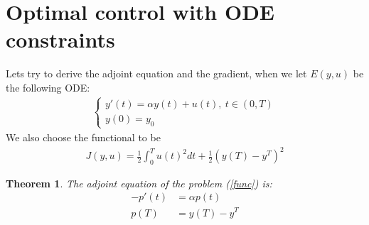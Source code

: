 \documentclass[11pt,a4paper]{article}
\newtheorem{theorem}{Theorem}
\begin{document}
\section{Optimal control with ODE constraints}
Lets try to derive the adjoint equation and the gradient, when we let $E(y,u)$ be the following ODE:
\begin{align*}
\left\{
     \begin{array}{lr}
       	y'(t)=\alpha y(t) +u(t), \ t \in (0,T)\\
       	   y(0)=y_0
     \end{array}
   \right.
\end{align*}
We also choose the functional to be
\begin{align}
J(y,u) = \frac{1}{2}\int_0^Tu(t)^2dt + \frac{1}{2}(y(T)-y^T)^2 \label{func}
\end{align}
\begin{theorem}
The adjoint equation of the problem (\ref{func}) is:
\begin{align*}     
-p'(t) &= \alpha p(t) \\
p(T) &= y(T)-y^T     
\end{align*}
\end{theorem}
\end{document}
